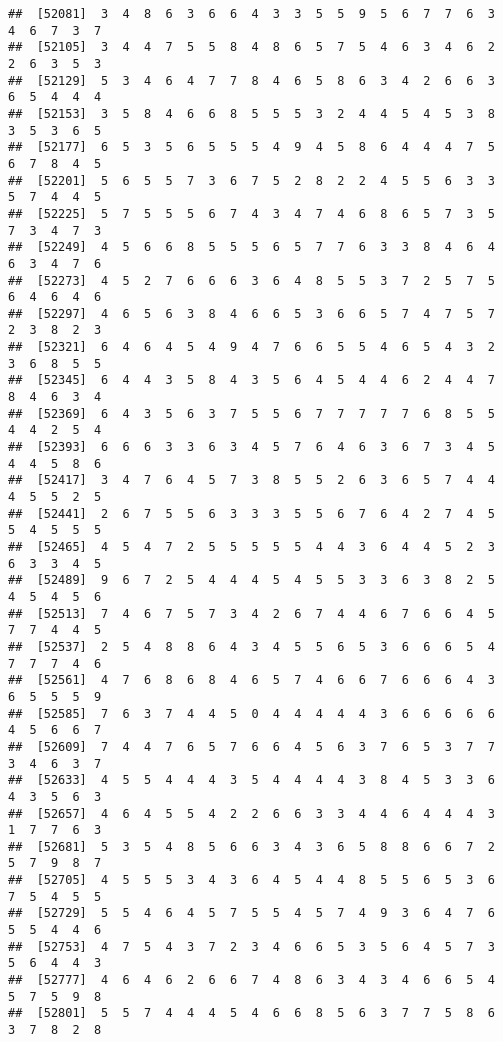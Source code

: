 \documentclass[
]{book}
\begin{document}
\begin{verbatim}
##  [52081]  3  4  8  6  3  6  6  4  3  3  5  5  9  5  6  7  7  6  3  4  6  7  3  7
##  [52105]  3  4  4  7  5  5  8  4  8  6  5  7  5  4  6  3  4  6  2  2  6  3  5  3
##  [52129]  5  3  4  6  4  7  7  8  4  6  5  8  6  3  4  2  6  6  3  6  5  4  4  4
##  [52153]  3  5  8  4  6  6  8  5  5  5  3  2  4  4  5  4  5  3  8  3  5  3  6  5
##  [52177]  6  5  3  5  6  5  5  5  4  9  4  5  8  6  4  4  4  7  5  6  7  8  4  5
##  [52201]  5  6  5  5  7  3  6  7  5  2  8  2  2  4  5  5  6  3  3  5  7  4  4  5
##  [52225]  5  7  5  5  5  6  7  4  3  4  7  4  6  8  6  5  7  3  5  7  3  4  7  3
##  [52249]  4  5  6  6  8  5  5  5  6  5  7  7  6  3  3  8  4  6  4  6  3  4  7  6
##  [52273]  4  5  2  7  6  6  6  3  6  4  8  5  5  3  7  2  5  7  5  6  4  6  4  6
##  [52297]  4  6  5  6  3  8  4  6  6  5  3  6  6  5  7  4  7  5  7  2  3  8  2  3
##  [52321]  6  4  6  4  5  4  9  4  7  6  6  5  5  4  6  5  4  3  2  3  6  8  5  5
##  [52345]  6  4  4  3  5  8  4  3  5  6  4  5  4  4  6  2  4  4  7  8  4  6  3  4
##  [52369]  6  4  3  5  6  3  7  5  5  6  7  7  7  7  7  6  8  5  5  4  4  2  5  4
##  [52393]  6  6  6  3  3  6  3  4  5  7  6  4  6  3  6  7  3  4  5  4  4  5  8  6
##  [52417]  3  4  7  6  4  5  7  3  8  5  5  2  6  3  6  5  7  4  4  4  5  5  2  5
##  [52441]  2  6  7  5  5  6  3  3  3  5  5  6  7  6  4  2  7  4  5  5  4  5  5  5
##  [52465]  4  5  4  7  2  5  5  5  5  5  4  4  3  6  4  4  5  2  3  6  3  3  4  5
##  [52489]  9  6  7  2  5  4  4  4  5  4  5  5  3  3  6  3  8  2  5  4  5  4  5  6
##  [52513]  7  4  6  7  5  7  3  4  2  6  7  4  4  6  7  6  6  4  5  7  7  4  4  5
##  [52537]  2  5  4  8  8  6  4  3  4  5  5  6  5  3  6  6  6  5  4  7  7  7  4  6
##  [52561]  4  7  6  8  6  8  4  6  5  7  4  6  6  7  6  6  6  4  3  6  5  5  5  9
##  [52585]  7  6  3  7  4  4  5  0  4  4  4  4  4  3  6  6  6  6  6  4  5  6  6  7
##  [52609]  7  4  4  7  6  5  7  6  6  4  5  6  3  7  6  5  3  7  7  3  4  6  3  7
##  [52633]  4  5  5  4  4  4  3  5  4  4  4  4  3  8  4  5  3  3  6  4  3  5  6  3
##  [52657]  4  6  4  5  5  4  2  2  6  6  3  3  4  4  6  4  4  4  3  1  7  7  6  3
##  [52681]  5  3  5  4  8  5  6  6  3  4  3  6  5  8  8  6  6  7  2  5  7  9  8  7
##  [52705]  4  5  5  5  3  4  3  6  4  5  4  4  8  5  5  6  5  3  6  7  5  4  5  5
##  [52729]  5  5  4  6  4  5  7  5  5  4  5  7  4  9  3  6  4  7  6  5  5  4  4  6
##  [52753]  4  7  5  4  3  7  2  3  4  6  6  5  3  5  6  4  5  7  3  5  6  4  4  3
##  [52777]  4  6  4  6  2  6  6  7  4  8  6  3  4  3  4  6  6  5  4  5  7  5  9  8
##  [52801]  5  5  7  4  4  4  5  4  6  6  8  5  6  3  7  7  5  8  6  3  7  8  2  8

\end{verbatim}
\end{document}
